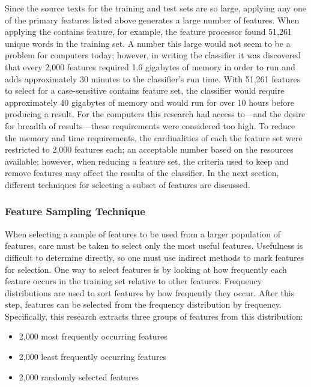 Since the source texts for the training and test sets are so large, applying any one of the primary features listed above generates a large number of features.
When applying the contains feature, for example, the feature processor found 51,261 unique words in the training set.
A number this large would not seem to be a problem for computers today; however, in writing the classifier it was discovered that every 2,000 features required 1.6 gigabytes of memory in order to run and adds approximately 30 minutes to the classifier's run time.
With 51,261 features to select for a case-sensitive contains feature set, the classifier would require approximately 40 gigabytes of memory and would run for over 10 hours before producing a result.
For the computers this research had access to---and the desire for breadth of results---these requirements were considered too high.
To reduce the memory and time requirements, the cardinalities of each the feature set were restricted to 2,000 features each; an acceptable number based on the resources available; however, when reducing a feature set, the criteria used to keep and remove features may affect the results of the classifier.
In the next section, different techniques for selecting a subset of features are discussed.

\subsubsection{Feature Sampling Technique}

When selecting a sample of features to be used from a larger population of features, care must be taken to select only the most useful features.
Usefulness is difficult to determine directly, so one must use indirect methods to mark features for selection.
One way to select features is by looking at how frequently each feature occurs in the training set relative to other features.
Frequency distributions are used to sort features by how frequently they occur.
After this step, features can be selected from the frequency distribution by frequency.
Specifically, this research extracts three groups of features from this distribution:

\begin{itemize}
\item 2,000 most frequently occurring features
\item 2,000 least frequently occurring features
\item 2,000 randomly selected features
\end{itemize}

